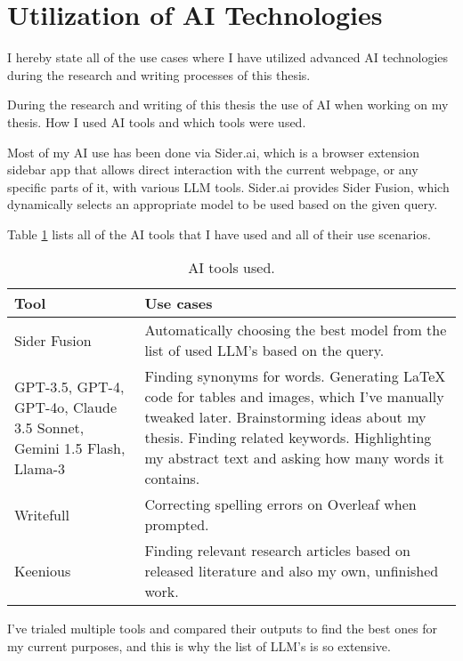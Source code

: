 



\chapter*{Utilization of AI Technologies\label{appendix:declaration}}

I hereby state all of the use cases where I have utilized advanced AI technologies during the research and writing processes of this thesis.

During the research and writing of this thesis the use of AI when working on my thesis. How I used AI tools and which tools were used.

Most of my AI use has been done via Sider.ai, which is a browser extension sidebar app that allows direct interaction with the current webpage, or any specific parts of it, with various LLM tools. Sider.ai provides Sider Fusion, which dynamically selects an appropriate model to be used based on the given query.

Table \ref{tab:declaration} lists all of the AI tools that I have used and all of their use scenarios.

\begin{table}[h]
  \centering
  \begin{tabular}{m{5cm}m{8cm}}
    \hline
    \textbf{Tool} & \textbf{Use cases} \\
    \hline
    Sider Fusion & Automatically choosing the best model from the list of used LLM's based on the query. \\
    \hline
    GPT-3.5, GPT-4, GPT-4o, Claude 3.5 Sonnet, Gemini 1.5 Flash, Llama-3 & Finding synonyms for words. Generating LaTeX code for tables and images, which I’ve manually tweaked later. Brainstorming ideas about my thesis. Finding related keywords. Highlighting my abstract text and asking how many words it contains.\\
    \hline
    Writefull& Correcting spelling errors on Overleaf when prompted. \\
    \hline
    Keenious & Finding relevant research articles based on released literature and also my own, unfinished work. \\
    \hline
  \end{tabular}
  \caption{AI tools used.}
  \label{tab:declaration}
\end{table}

I've trialed multiple tools and compared their outputs to find the best ones for my current purposes, and this is why the list of LLM's is so extensive.